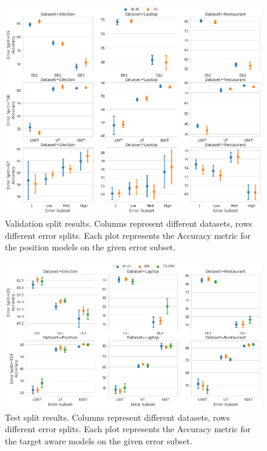 \begin{figure}[h!]
    \centering
    \includegraphics[scale=0.42]{images/augmentation/methods_performance/Position_Encoding/position_split_overall_validation_results.png}
    \caption{Validation split results. Columns represent different datasets, rows different error splits. Each plot represents the Accuracy metric for the position models on the given error subset.}
    \label{fig:aug_position_split_overall_validation_results}
\end{figure}

\begin{figure}[!h]
    \centering
    \includegraphics[scale=0.42]{images/augmentation/methods_performance/Inter_Target/inter_target_encoding_split_overall_test.png}
    \caption{Test split results. Columns represent different datasets, rows different error splits. Each plot represents the Accuracy metric for the target aware models on the given error subset.}
    \label{fig:aug_inter_target_encoding_split_overall_test}
\end{figure}

